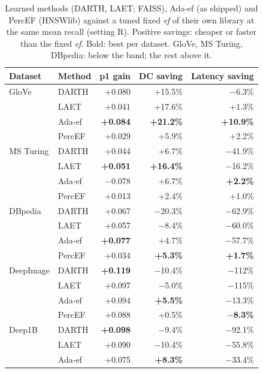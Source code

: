 \documentclass[sigconf, nonacm]{acmart}
\newcommand{\ef}{\textit{ef}}
\begin{document}
\begin{table}[t]
  \caption{Learned methods (DARTH, LAET; FAISS), Ada-ef (as shipped) and PercEF (HNSWlib) against a
  tuned fixed \ef{} of their own library at the same mean recall (setting R). Positive savings:
  cheaper or faster than the fixed \ef{}. Bold: best per dataset. GloVe, MS Turing, DBpedia: below
  the band; the rest above it.}
  \label{tab:darth}
  \centering\footnotesize
  \begin{tabular}{llrrr}
    \toprule
    Dataset & Method & p1 gain & DC saving & Latency saving \\
    \midrule
    GloVe         & DARTH  & +0.080 & +15.5\% & $-$6.3\% \\
                  & LAET   & +0.041 & +17.6\% & +1.3\% \\
                  & Ada-ef & \textbf{+0.084} & \textbf{+21.2\%} & \textbf{+10.9\%} \\
                  & PercEF & +0.029 & +5.9\% & +2.2\% \\
    \midrule
    MS Turing     & DARTH  & +0.044 & +6.7\% & $-$41.9\% \\
                  & LAET   & \textbf{+0.051} & \textbf{+16.4\%} & $-$16.2\% \\
                  & Ada-ef & $-$0.078 & +6.7\% & \textbf{+2.2\%} \\
                  & PercEF & +0.013 & +2.4\% & +1.0\% \\
    \midrule
    DBpedia       & DARTH  & +0.067 & $-$20.3\% & $-$62.9\% \\
                  & LAET   & +0.057 & $-$8.4\% & $-$60.0\% \\
                  & Ada-ef & \textbf{+0.077} & +4.7\% & $-$57.7\% \\
                  & PercEF & +0.034 & \textbf{+5.3\%} & \textbf{+1.7\%} \\
    \midrule
    DeepImage     & DARTH  & \textbf{+0.119} & $-$10.4\% & $-$112\% \\
                  & LAET   & +0.097 & $-$5.0\% & $-$115\% \\
                  & Ada-ef & +0.094 & \textbf{+5.5\%} & $-$13.3\% \\
                  & PercEF & +0.088 & +0.5\% & \textbf{$-$8.3\%} \\
    \midrule
    Deep1B        & DARTH  & \textbf{+0.098} & $-$9.4\% & $-$92.1\% \\
                  & LAET   & +0.090 & $-$10.4\% & $-$55.8\% \\
                  & Ada-ef & +0.075 & \textbf{+8.3\%} & $-$33.4\% \\

\end{tabular}
\end{table}
\end{document}

